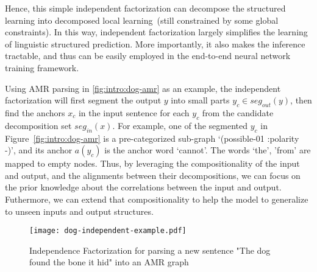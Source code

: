 Hence, this simple independent factorization can decompose the
structured learning into decomposed local learning~(still constrained
by some global constraints). In this way, independent factorization
largely simplifies the learning of linguistic structured
prediction. More importantly, it also makes the inference tractable,
and thus can be easily employed in the end-to-end neural network
training framework.

Using AMR parsing in \autoref{fig:intro:dog-amr} as an example, the
independent factorization will first segment the output $y$ into small
parts $y_{c} \in seg_{out}(y)$, then find the anchors $x_{c}$ in the
input sentence for each $y_{c}$ from the candidate decomposition set
$seg_{in}(x)$. For example, one of the segmented $y_{c}$ in
Figure~\ref{fig:intro:dog-amr} is a pre-categorized sub-graph
`(possible-01 :polarity -)', and its anchor $a(y_{c})$ is the anchor
word `cannot'. The words `the', 'from' are mapped to empty nodes.
Thus, by leveraging the compositionality of the input and output, and
the alignments between their decompositions, we can focus on the prior
knowledge about the correlations between the input and
output. Futhermore, we can extend that compositionality to help the
model to generalize to unseen inputs and output structures.

\begin{figure}[!th]
\centering
\texttt{[image: dog-independent-example.pdf]}
\caption{\label{fig:intro:independent-example}Independence
  Factorization for parsing a new sentence "The dog found the bone it
  hid" into an AMR graph}
\end{figure}

